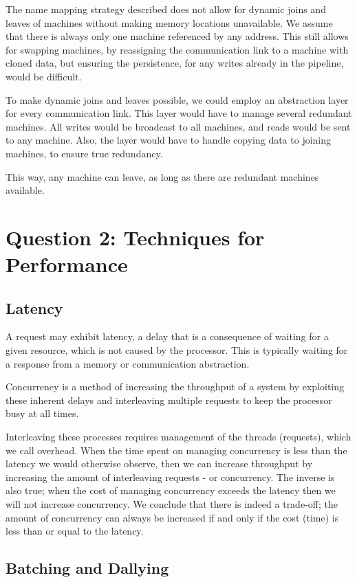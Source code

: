 \documentclass[11pt]{article}
\begin{document}
    The name mapping strategy described does not allow for dynamic joins and leaves of machines without making memory locations unavailable. We assume that there is always only one machine referenced by any address. This still allows for swapping machines, by reassigning the communication link to a machine with cloned data, but ensuring the persistence, for any writes already in the pipeline, would be difficult.

    To make dynamic joins and leaves possible, we could employ an abstraction layer for every communication link. This layer would have to manage several redundant machines. All writes would be broadcast to all machines, and reads would be sent to any machine. Also, the layer would have to handle copying data to joining machines, to ensure true redundancy. 

    This way, any machine can leave, as long as there are redundant machines available.
\section*{Question 2: Techniques for Performance}

\subsection*{Latency}

A request may exhibit latency, a delay that is a consequence of waiting for
a given resource, which is not caused by the processor. This is typically
waiting for a response from a memory or communication abstraction.

Concurrency is a method of increasing the throughput of a system by exploiting
these inherent delays and interleaving multiple requests to keep the processor
busy at all times.

Interleaving these processes requires management of the threads (requests),
which we call overhead. When the time spent on managing concurrency is less
than the latency we would otherwise observe, then we can increase throughput
by increasing the amount of interleaving requests - or concurrency. The inverse
is also true; when the cost of managing concurrency exceeds the latency then
we will not increase concurrency. We conclude that there is indeed a trade-off;
the amount of concurrency can always be increased if and only if the cost (time)
is less than or equal to the latency.

\subsection*{Batching and Dallying}
\end{document}
